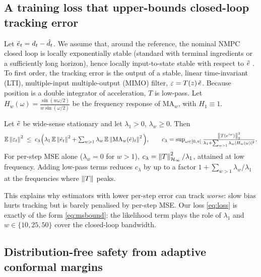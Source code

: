 \subsection{A training loss that upper-bounds closed-loop tracking error}
Let $\tilde e_t=d_t-\hat d_t$. We assume that, around the reference, the nominal NMPC closed loop is locally exponentially stable (standard with terminal ingredients or a sufficiently long horizon), hence locally input-to-state stable with respect to $\tilde e$ \citep{sontag2008input}. To first order, the tracking error is the output of a stable, linear time-invariant (LTI), multiple-input multiple-output (MIMO) filter, $\varepsilon=T(z)\,\tilde e$. Because position is a double integrator of acceleration, $T$ is low-pass. Let $H_w(\omega)=\frac{\sin(w\omega/2)}{w\sin(\omega/2)}$ be the frequency response of $\mathrm{MA}_w$, with $H_1\equiv 1$.

\begin{theorem}
\label{thm:ms}
Let $\tilde e$ be wide-sense stationary and let $\lambda_1>0$, $\lambda_w\ge 0$. Then
\begin{equation}
  \mathbb{E}\left\lVert \varepsilon_t \right\rVert^2 \;\le\; c_\lambda\Big(\lambda_1\,\mathbb{E}\left\lVert \tilde e_t \right\rVert^2+\textstyle\sum_{w>1}\lambda_w\,\mathbb{E}\left\lVert \mathrm{MA}_w(\tilde e)_t \right\rVert^2\Big),
  \qquad
  c_\lambda=\sup_{\omega\in[0,\pi]}\frac{\left\lVert T(e^{i\omega}) \right\rVert_2^2}{\lambda_1+\sum_{w>1}\lambda_w|H_w(\omega)|^2}.
  \label{eq:msbound}
\end{equation}
For per-step MSE alone ($\lambda_w=0$ for $w>1$), $c_\lambda=\left\lVert T \right\rVert_{\mathcal{H}_\infty}^2/\lambda_1$, attained at low frequency. Adding low-pass terms reduces $c_\lambda$ by up to a factor $1+\sum_{w>1}\lambda_w/\lambda_1$ at the frequencies where $\left\lVert T \right\rVert$ peaks.
\end{theorem}
This explains why estimators with lower per-step error can track \emph{worse}: slow bias hurts tracking but is barely penalised by per-step MSE. Our loss \eqref{eq:loss} is exactly of the form \eqref{eq:msbound}: the likelihood term plays the role of $\lambda_1$ and $w\in\{10,25,50\}$ cover the closed-loop bandwidth.

\subsection{Distribution-free safety from adaptive conformal margins}

